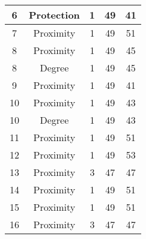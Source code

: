 \documentclass[results.tex]{subfiles}
\begin{document}
\begin{center}
\begin{tabular}{| c || c | c | c | c |}
            \hline
            6                       & Protection                   & 1                      & 49                      & 41                   \\
            \hline
            7                       & Proximity                    & 1                      & 49                      & 51                   \\
            \hline
            8                       & Proximity                    & 1                      & 49                      & 45                   \\
            \hline
            8                       & Degree                       & 1                      & 49                      & 45                   \\
            \hline
            9                       & Proximity                    & 1                      & 49                      & 41                   \\
            \hline
            10                      & Proximity                    & 1                      & 49                      & 43                   \\
            \hline
            10                      & Degree                       & 1                      & 49                      & 43                   \\
            \hline
            11                      & Proximity                    & 1                      & 49                      & 51                   \\
            \hline
            12                      & Proximity                    & 1                      & 49                      & 53                   \\
            \hline
            13                      & Proximity                    & 3                      & 47                      & 47                   \\
            \hline
            14                      & Proximity                    & 1                      & 49                      & 51                   \\
            \hline
            15                      & Proximity                    & 1                      & 49                      & 51                   \\
            \hline
            16                      & Proximity                    & 3                      & 47                      & 47                   \\

\end{tabular}
\end{center}
\end{document}

